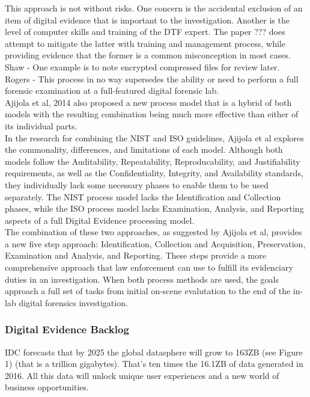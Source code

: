 \documentclass[12pt]{article}
\begin{document}
This approach is not without risks.  One concern is the accidental exclusion of an item of digital evidence that is
important to the investigation.  Another is the level of computer skills and training of the DTF expert.  The paper ???
does attempt to mitigate the latter with training and management process, while providing evidence that the former
is a common misconception in most cases.\\

Shaw - One example is to note encrypted compressed files for review later.\\

Rogers - This process in no way supersedes the ability or need to perform a full forensic examination at a full-featured
digital forensic lab.\\

Ajijola et al, 2014\cite{ajijola2014review} also proposed a new process
model that is a hybrid of both models with the resulting combination being much more effective than either of its 
individual parts.\\

In the research for combining the NIST and ISO guidelines, Ajijola et al\cite{ajijola2014review} explores the
commonality, differences, and limitations of each model.  Although both models follow the Auditability,
Repeatability, Reproducability, and Justifiability requirements, as well as the Confidentiality, Integrity, and
Availability standards, they individually lack some necessary phases to enable them to be used separately.  The NIST
process model lacks the Identification and Collection phases, while the ISO process model lacks Examination, Analysis,
and Reporting aspects of a full Digital Evidence processing model.\\

The combination of these two approaches, as suggested by Ajijola et al\cite{ajijola2014review}, provides a new five 
step approach: Identification, Collection and Acquisition, Preservation, Examination and Analysis, and Reporting.
These steps provide a more comprehensive approach that law enforcement can use to fulfill its evidenciary duties in
an investigation.  When both process methods are used, the goals approach a full set of tasks from initial on-scene
evalutation to the end of the in-lab digital forensics investigation.\\

\subsubsection{Digital Evidence Backlog}
IDC forecasts that by 2025 the global datasphere will grow to 163ZB (see Figure 1) (that is a trillion gigabytes).
That's ten times the 16.1ZB of data generated in 2016. All this data will unlock unique user experiences and
a new world of business opportunities.\\
\end{document}
